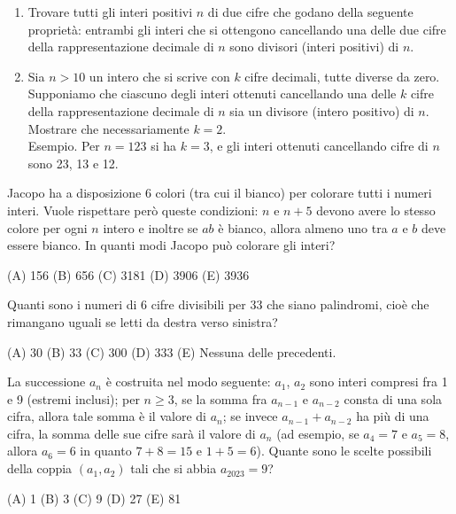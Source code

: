 \begin{esercizio}
    \label{ex:distrettuali_2018_15}
    \begin{enumerate}
        \item Trovare tutti gli interi positivi $n$ di due cifre che godano della seguente proprietà: entrambi
        gli interi che si ottengono cancellando una delle due cifre della rappresentazione decimale
        di $n$ sono divisori (interi positivi) di $n$.
        \item Sia $n > 10$ un intero che si scrive con $k$ cifre decimali, tutte diverse da zero.
        Supponiamo che ciascuno degli interi ottenuti cancellando una delle $k$ cifre della rappresentazione decimale
        di $n$ sia un divisore (intero positivo) di $n$.
        Mostrare che necessariamente $k = 2$. \\
        Esempio.
        Per $n = 123$ si ha $k = 3$, e gli interi ottenuti cancellando cifre di $n$ sono 23, 13 e 12.
    \end{enumerate}
\end{esercizio}

\begin{esercizio}
    \label{ex:distrettuali_2019}
    Jacopo ha a disposizione 6 colori (tra cui il bianco) per colorare tutti i numeri interi.
    Vuole rispettare però queste condizioni: $n$ e $n + 5$ devono avere lo stesso colore per ogni $n$ intero e
    inoltre se $ab$ è bianco, allora almeno uno tra $a$ e $b$ deve essere bianco.
    In quanti modi Jacopo può colorare gli interi?

    (A) 156 \quad (B) 656 \quad (C) 3181 \quad (D) 3906 \quad (E) 3936
\end{esercizio}

\begin{esercizio}
    \label{ex:distrettuali_2021}
    Quanti sono i numeri di 6 cifre divisibili per 33 che siano palindromi, cioè che rimangano uguali
    se letti da destra verso sinistra?

    (A) 30 \quad (B) 33 \quad (C) 300 \quad (D) 333 \quad (E) Nessuna delle precedenti.
\end{esercizio}

\begin{esercizio}
    \label{ex:distrettuali_2023_9}
    La successione $a_n$ è costruita nel modo seguente:
    $a_1$, $a_2$ sono interi compresi fra 1 e 9 (estremi inclusi);
    per $n \ge 3$, se la somma fra $a_{n-1}$ e $a_{n-2}$ consta di una sola cifra, allora tale somma è il valore di $a_n$;
    se invece $a_{n-1} + a_{n-2}$ ha più di una cifra, la somma delle sue cifre sarà il valore di $a_n$
    (ad esempio, se $a_4 = 7$ e $a_5 = 8$, allora $a_6 = 6$ in quanto $7 + 8 = 15$ e $1 + 5 = 6$).
    Quante sono le scelte possibili della coppia $(a_1, a_2)$ tali che si abbia $a_{2023} = 9$?

    (A) 1 \quad (B) 3 \quad (C) 9 \quad (D) 27 \quad (E) 81
\end{esercizio}


